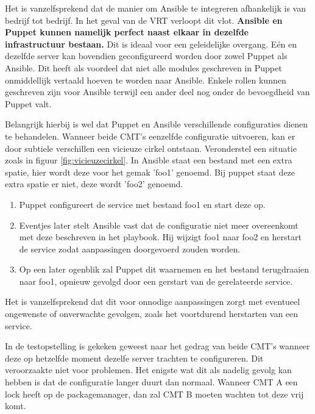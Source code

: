 Het is vanzelfsprekend dat de manier om Ansible te integreren afhankelijk is van bedrijf tot bedrijf. In het geval van de VRT verloopt dit vlot. \textbf{Ansible en Puppet kunnen namelijk perfect naast elkaar in dezelfde infrastructuur bestaan.} Dit is ideaal voor een geleidelijke overgang. E\'en en dezelfde server kan bovendien geconfigureerd worden door zowel Puppet als Ansible. Dit heeft als voordeel dat niet alle modules geschreven in Puppet onmiddellijk vertaald hoeven te worden naar Ansible. Enkele rollen kunnen geschreven zijn voor Ansible terwijl een ander deel nog onder de bevoegdheid van Puppet valt.

 Belangrijk hierbij is wel dat Puppet en Ansible verschillende configuraties dienen te behandelen. Wanneer beide \gls{CMT}'s eenzelfde configuratie uitvoeren, kan er door subtiele verschillen een vicieuze cirkel ontstaan.
Veronderstel een situatie zoals in figuur \ref{fig:vicieuzecirkel}. In Ansible staat een bestand met een extra spatie, hier wordt deze voor het gemak 'foo1' genoemd. Bij puppet staat deze extra spatie er niet, deze wordt 'foo2' genoemd. 
\begin{enumerate}
\item Puppet configureert de service met bestand foo1 en start deze op.
\item  Eventjes later stelt Ansible vast dat de configuratie niet meer overeenkomt met deze beschreven in het playbook. Hij wijzigt foo1 naar foo2 en herstart de service zodat aanpassingen doorgevoerd zouden worden.
\item  Op een later ogenblik zal Puppet dit waarnemen en het bestand terugdraaien naar foo1, opnieuw gevolgd door een gerstart van de gerelateerde service.
\end{enumerate}
Het is vanzelfsprekend dat dit voor onnodige aanpassingen zorgt met eventueel ongewenste of onverwachte gevolgen, zoals het voortdurend herstarten van een service.

In de testopstelling is gekeken geweest naar het gedrag van beide \gls{CMT}'s wanneer deze op hetzelfde moment dezelfe server trachten te configureren. Dit veroorzaakte niet voor problemen.
Het enigste wat dit als nadelig gevolg kan hebben is dat de configuratie langer duurt dan normaal. Wanneer \gls{CMT} A een lock heeft op de \gls{packagemanager}, dan zal \gls{CMT} B moeten wachten tot deze vrij komt. 



